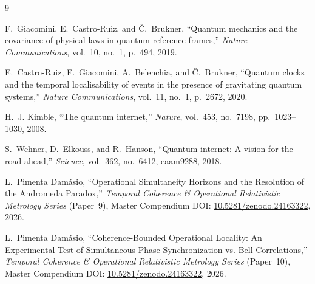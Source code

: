 \documentclass[11pt,a4paper]{article}
\begin{document}
\begin{thebibliography}{9}

F.~Giacomini, E.~Castro-Ruiz, and \v{C}.~Brukner,
``Quantum mechanics and the covariance of physical laws in quantum reference frames,''
\textit{Nature Communications}, vol.~10, no.~1, p.~494, 2019.

E.~Castro-Ruiz, F.~Giacomini, A.~Belenchia, and \v{C}.~Brukner,
``Quantum clocks and the temporal localisability of events in the presence of gravitating quantum systems,''
\textit{Nature Communications}, vol.~11, no.~1, p.~2672, 2020.

H.~J. Kimble,
``The quantum internet,''
\textit{Nature}, vol.~453, no.~7198, pp.~1023--1030, 2008.

S.~Wehner, D.~Elkouss, and R.~Hanson,
``Quantum internet: A vision for the road ahead,''
\textit{Science}, vol.~362, no.~6412, eaam9288, 2018.

L.~{Pimenta Damásio},
``Operational Simultaneity Horizons and the Resolution of the Andromeda Paradox,''
\textit{Temporal Coherence \& Operational Relativistic Metrology Series} (Paper~9), Master Compendium DOI: \href{https://doi.org/10.5281/zenodo.24163322}{10.5281/zenodo.24163322}, 2026.

L.~{Pimenta Damásio},
``Coherence-Bounded Operational Locality: An Experimental Test of Simultaneous Phase Synchronization vs. Bell Correlations,''
\textit{Temporal Coherence \& Operational Relativistic Metrology Series} (Paper~10), Master Compendium DOI: \href{https://doi.org/10.5281/zenodo.24163322}{10.5281/zenodo.24163322}, 2026.

\end{thebibliography}
\end{document}
